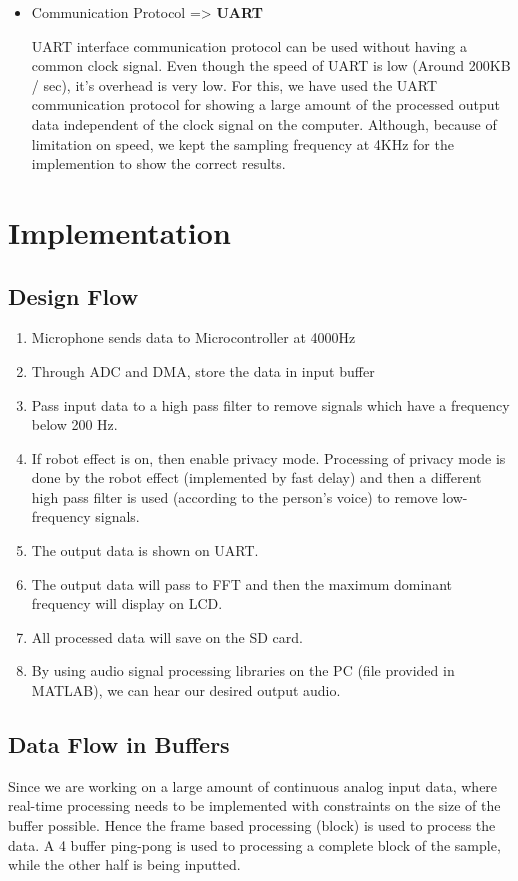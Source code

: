 \documentclass[11pt]{article}
\begin{document}
\begin{itemize}
\item Communication Protocol => \textbf{UART}

UART interface communication protocol can be used without having a common clock signal. Even though the speed of UART is low (Around 200KB / sec), it's overhead is very low. For this, we have used the UART communication protocol for showing a large amount of the processed output data independent of the clock signal on the computer. Although, because of limitation on speed, we kept the sampling frequency at 4KHz for the implemention to show the correct results.
\end{itemize}

\section{Implementation}
\label{sec:orgc65004e}
\subsection{Design Flow}
\label{sec:orgc7efe6b}
\begin{enumerate}
\item Microphone sends data to Microcontroller at 4000Hz
\item Through ADC and DMA, store the data in input buffer
\item Pass input data to a high pass filter to remove signals which have a frequency below 200 Hz.
\item If robot effect is on, then enable privacy mode. Processing of privacy mode is done by the robot effect (implemented by fast delay) and then a different high pass filter is used (according to the person's voice) to remove low-frequency signals.
\item The output data is shown on UART.
\item The output data will pass to FFT and then the maximum dominant frequency will display on LCD.
\item All processed data will save on the SD card.
\item By using audio signal processing libraries on the PC (file provided in MATLAB), we can hear our desired output audio.
\end{enumerate}

\subsection{Data Flow in Buffers}
\label{sec:org7c2293f}
Since we are working on a large amount of continuous analog input data, where real-time processing needs to be implemented with constraints on the size of the buffer possible. Hence the frame based processing (block) is used to process the data. A 4 buffer ping-pong is used to processing a complete block of the sample, while the other half is being inputted.
\end{document}
